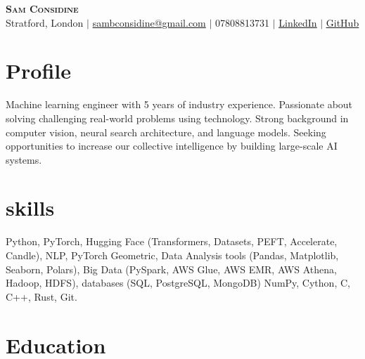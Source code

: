 \documentclass[letterpaper,11pt]{article}
\begin{document}

\begin{center}
    \textbf{\Huge \scshape{Sam Considine}} \\ \vspace{8pt}
    \small Stratford, London $|$ 
    \href{mailto:sambconsidine@gmail.com}{sambconsidine@gmail.com} $|$
    07808813731 $|$
    \href{https://uk.linkedin.com/in/samuel-considine-685249158}{\underline{LinkedIn}} $|$
    \href{https://github.com/samconsidine}{\underline{GitHub}} 
\end{center}

\vspace{0.3em}

\section{Profile}

Machine learning engineer with 5 years of industry experience. Passionate about solving challenging real-world problems using technology. Strong background in computer vision, neural search architecture, and language models. Seeking opportunities to increase our collective intelligence by building large-scale AI systems.

\section{skills}
Python, PyTorch, Hugging Face (Transformers, Datasets, PEFT, Accelerate, Candle), NLP, PyTorch Geometric, Data Analysis tools (Pandas, Matplotlib, Seaborn, Polars), Big Data (PySpark, AWS Glue, AWS EMR, AWS Athena, Hadoop, HDFS), databases (SQL, PostgreSQL, MongoDB) NumPy, Cython, C, C++, Rust, Git.

\section{Education}
\end{document}
